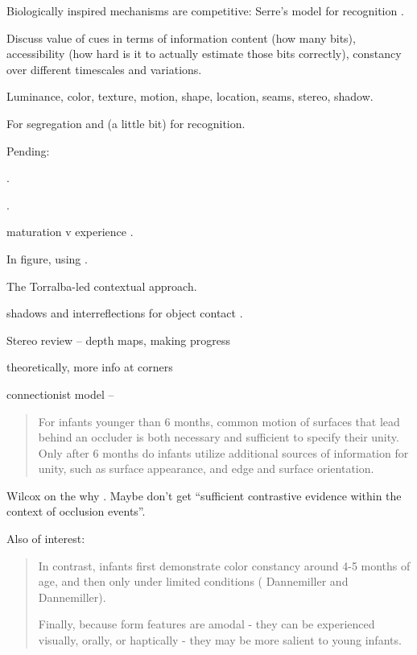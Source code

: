 Biologically inspired mechanisms are competitive:
Serre's model for recognition \cite{serre05object}.


Discuss value of cues in terms of information content (how many bits),
accessibility (how hard is it to actually estimate those bits
correctly), constancy over different timescales and variations.

Luminance, color, texture, motion, shape, location, seams, stereo,
shadow.

For segregation and (a little bit) for recognition.

Pending:

\cite{swain91color}.

\cite{schiele00recognition}.

\cite{lowe04distinctive}

\cite{felzenszwalb04efficient}

maturation v experience \cite{quinn05learning}.

In figure, using \cite{felzenszwalb04efficient}.

\cite{gibson88exploratory}

\cite{spelke90principles}

\cite{martin01database}

The Torralba-led contextual approach.


shadows and interreflections for object contact
\cite{madison01use}.


Stereo review -- depth maps, making progress
\cite{scharstein02taxonomy}

theoretically, more info at corners \cite{feldman05information}

connectionist model
\cite{mareschal02learning} --

\begin{quote}

For infants younger than 6 months, common motion of surfaces that lead
behind an occluder is both necessary and sufficient to specify their
unity. Only after 6 months do infants utilize additional sources of
information for unity, such as surface appearance, and edge and
surface orientation. \cite{mareschal02learning}

\end{quote}


Wilcox on the why \cite{wilcox99object}.  Maybe don't get
``sufficient contrastive evidence within the context of
occlusion events''.


Also of interest:

\begin{quote}

In contrast, infants first demonstrate color constancy around 4-5
months of age, and then only under limited conditions ( Dannemiller
and Dannemiller).

Finally, because form features are amodal - they can be
experienced visually, orally, or haptically - they may be more
salient to young infants.

\end{quote}


